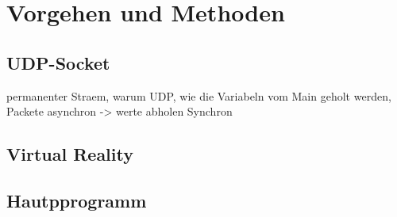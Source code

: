 \section{Vorgehen und Methoden}
\subsection{UDP-Socket}
permanenter Straem, warum UDP, wie die Variabeln vom Main geholt werden, Packete asynchron -> werte abholen Synchron
\subsection{Virtual Reality}
\subsection{Hautpprogramm}

